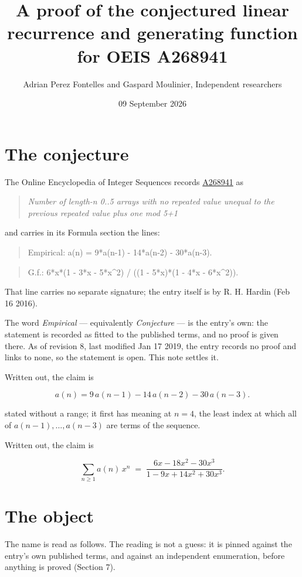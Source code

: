 \documentclass[11pt]{article}
\title{A proof of the conjectured linear recurrence and generating function for OEIS A268941}
\author{Adrian Perez Fontelles and Gaspard Moulinier, Independent researchers}
\date{09 September 2026}
\theoremstyle{definition}
\begin{document}
\maketitle
\section{The conjecture}

The Online Encyclopedia of Integer Sequences records \href{https://oeis.org/A268941}{A268941} as

\begin{quote}\itshape Number of length-n 0..5 arrays with no repeated value unequal to the previous repeated value plus one mod 5+1\end{quote}

and carries in its Formula section the lines:

\begin{quote}\ttfamily Empirical: a(n) = 9*a(n-1) - 14*a(n-2) - 30*a(n-3).\end{quote}

\begin{quote}\ttfamily G.f.: 6*x*(1 - 3*x - 5*x\textasciicircum{}2) / ((1 - 5*x)*(1 - 4*x - 6*x\textasciicircum{}2)).\end{quote}

That line carries no separate signature; the entry itself is by R. H. Hardin (Feb 16 2016).

The word {\itshape Empirical} --- equivalently {\itshape Conjecture} --- is the entry's own: the statement is recorded as fitted to the published terms, and no proof is given there. As of revision 8, last modified Jan 17 2019, the entry records no proof and links to none, so the statement is open. This note settles it.

Written out, the claim is

\[a(n) = 9\,a(n-1) - 14\,a(n-2) - 30\,a(n-3).\]

stated without a range; it first has meaning at $n = 4$, the least index at which all of $a(n-1),\dots,a(n-3)$ are terms of the sequence.

Written out, the claim is

\[\sum_{n \ge 1} a(n)\,x^n \;=\; \frac{6x - 18x^{2} - 30x^{3}}{1 - 9x + 14x^{2} + 30x^{3}}.\]

\section{The object}

The name is read as follows. The reading is not a guess: it is pinned against the entry's own published terms, and against an independent enumeration, before anything is proved (Section 7).
\end{document}
